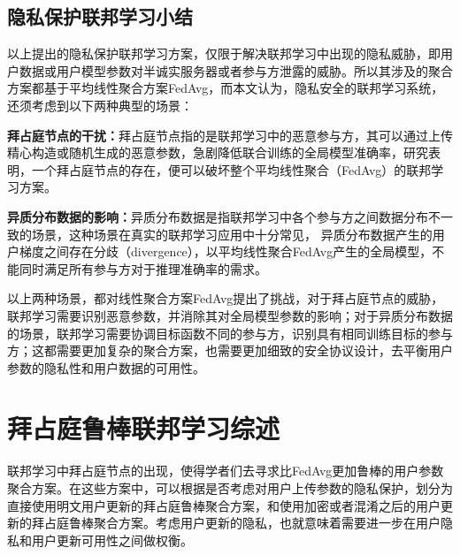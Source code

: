 \subsection{隐私保护联邦学习小结}
以上提出的隐私保护联邦学习方案，仅限于解决联邦学习中出现的隐私威胁，即用户数据或用户模型参数对半诚实服务器或者参与方泄露的威胁。所以其涉及的聚合方案都基于平均线性聚合方案FedAvg\cite{mcmahan2017communication}，而本文认为，隐私安全的联邦学习系统，还须考虑到以下两种典型的场景：
\begin{compactitem}
	\item \textbf{拜占庭节点的干扰：}拜占庭节点指的是联邦学习中的恶意参与方，其可以通过上传精心构造或随机生成的恶意参数，急剧降低联合训练的全局模型准确率，研究\cite{blanchard2017machine}表明，一个拜占庭节点的存在，便可以破坏整个平均线性聚合（FedAvg）的联邦学习方案。
	\item \textbf{异质分布数据的影响：}异质分布数据是指联邦学习中各个参与方之间数据分布不一致的场景，这种场景在真实的联邦学习应用中十分常见\cite{li2020federated, gao2022feddc, ghosh2020efficient, briggs2020federated}，
	异质分布数据产生的用户梯度之间存在分歧（divergence），以平均线性聚合FedAvg产生的全局模型，不能同时满足所有参与方对于推理准确率的需求。
\end{compactitem}
以上两种场景，都对线性聚合方案FedAvg提出了挑战，对于拜占庭节点的威胁，联邦学习需要识别恶意参数，并消除其对全局模型参数的影响；对于异质分布数据的场景，联邦学习需要协调目标函数不同的参与方，识别具有相同训练目标的参与方；这都需要更加复杂的聚合方案，也需要更加细致的安全协议设计，去平衡用户参数的隐私性和用户数据的可用性。

\section{拜占庭鲁棒联邦学习综述}
\label{sec:byzantine}
联邦学习中拜占庭节点的出现，使得学者们去寻求比FedAvg更加鲁棒的用户参数聚合方案\cite{blanchard2017machine, guerraoui2018hidden, yin2018byzantine, DBLP:conf/ndss/CaoF0G21, he2020secure, hashemi2021byzantine, khazbak2020mlguard, liu2021privacy, nguyen2022flame, hao2021efficient, dong2021flod}。在这些方案中，可以根据是否考虑对用户上传参数的隐私保护，划分为直接使用明文用户更新的拜占庭鲁棒聚合方案\cite{blanchard2017machine, guerraoui2018hidden, yin2018byzantine, DBLP:conf/ndss/CaoF0G21}，和使用加密或者混淆之后的用户更新的拜占庭鲁棒聚合方案\cite{he2020secure, hashemi2021byzantine, khazbak2020mlguard, liu2021privacy, nguyen2022flame, hao2021efficient, dong2021flod}。考虑用户更新的隐私，也就意味着需要进一步在用户隐私和用户更新可用性之间做权衡。

